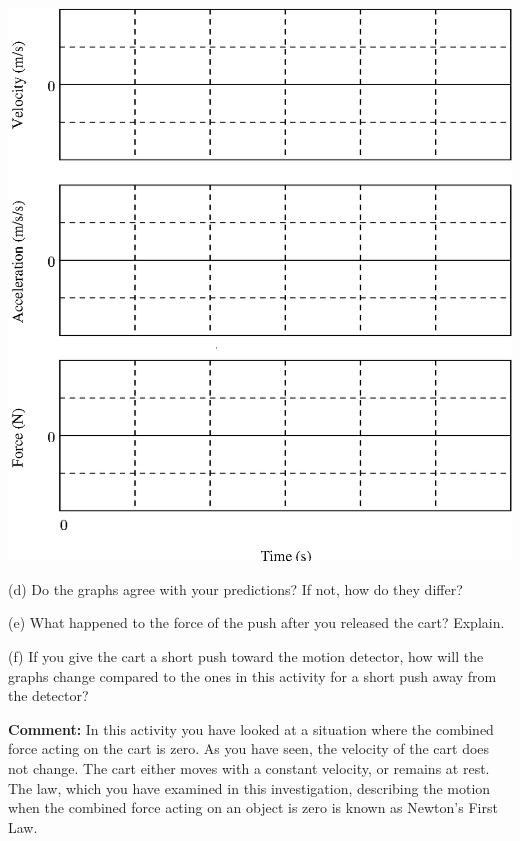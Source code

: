 \pagebreak[2]
\vspace{0.3cm}
{\par\centering \includegraphics{force2/force2_fig4.eps} \par}
\vspace{0.3cm}

(d) Do the graphs agree with your predictions? If not, how do they differ?
\answerspace{20mm}

(e) What happened to the force of the push after you released the cart? Explain.
\answerspace{20mm}

(f) If you give the cart a short push toward the motion detector, how will the
graphs change compared to the ones in this activity for a short push away from
the detector?
\answerspace{20mm}

\pagebreak[2]
\textbf{Comment:} In this activity you have looked at a situation where the
combined force acting on the cart is zero. As you have seen, the velocity of
the cart does not change. The cart either moves with a constant velocity, or
remains at rest. The law, which you have examined in this investigation, describing
the motion when the combined force acting on an object is zero is known as Newton's
First Law.

